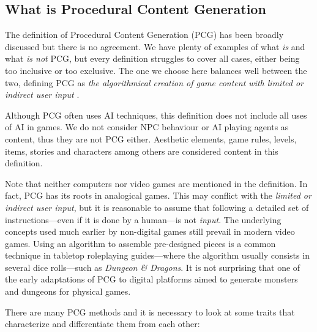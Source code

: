 
\subsection{What is Procedural Content Generation}
The definition of Procedural Content Generation (PCG) has been broadly discussed but there is no agreement. We have plenty of examples of what \textit{is} and what \textit{is not} PCG, but every definition struggles to cover all cases, either being too inclusive or too exclusive. The one we choose here balances well between the two, defining PCG as \textit{the algorithmical creation of game content with limited or indirect user input} \cite{togelius2011procedural}.


Although PCG often uses AI techniques, this definition does not include all uses of AI in games. We do not consider NPC behaviour or AI playing agents as content, thus they are not PCG either. Aesthetic elements, game rules, levels, items, stories and characters among others are considered content in this definition.


Note that neither computers nor video games are mentioned in the definition. In fact, PCG has its roots in analogical games. This may conflict with the \textit{limited or indirect user input}, but it is reasonable to assume that following a detailed set of instructions---even if it is done by a human---is not \textit{input}. The underlying concepts used much earlier by non-digital games still prevail in modern video games. Using an algorithm to assemble pre-designed pieces is a common technique in tabletop roleplaying guides---where the algorithm usually consists in several dice rolls---such as \textit{Dungeon \& Dragons}. It is not surprising that one of the early adaptations of PCG to digital platforms aimed to generate monsters and dungeons for physical games.\cite{smith2015analog}


There are many PCG methods and it is necessary to look at some traits that characterize and differentiate them from each other: \cite{togelius2016introduction}

